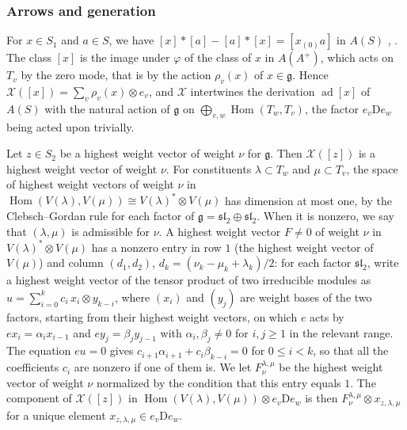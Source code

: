 \documentclass[leqno]{article}
\newcommand{\D}{\mathrm{D}}
\renewcommand{\leq}{\ensuremath{\leqslant}}
\renewcommand{\geq}{\ensuremath{\geqslant}}
\newcommand{\ot}{\otimes}
\numberwithin{equation}{section}
\begin{document}
\subsubsection{Arrows and generation}
\label{zhu:subsec:arrows}

For $x \in S_1$ and $a \in S$, we have $[x] * [a] - [a] * [x] = [x_{(0)} a]$ in $A(S)$ \cite[Lemma 2.1.3 p.~248]{Zhu96}, \cite[(11.1)]{Arh26}. The class $[x]$ is the image under $\varphi$ of the class of $x$ in $A(A^+)$, which acts on $T_v$ by the zero mode, that is by the action $\rho_v(x)$ of $x \in \mathfrak g$. Hence $\mathcal X([x]) = \sum_v \rho_v(x) \ot e_v$, and $\mathcal X$ intertwines the derivation $\operatorname{ad}[x]$ of $A(S)$ with the natural action of $\mathfrak g$ on $\bigoplus_{v,w} \operatorname{Hom}(T_w,T_v)$, the factor $e_v\D e_w$ being acted upon trivially.

Let $z \in S_2$ be a highest weight vector of weight $\nu$ for $\mathfrak g$. Then $\mathcal X([z])$ is a highest weight vector of weight $\nu$. For constituents $\lambda \subset T_w$ and $\mu \subset T_v$, the space of highest weight vectors of weight $\nu$ in $\operatorname{Hom}(V(\lambda),V(\mu)) \cong V(\lambda)^* \ot V(\mu)$ has dimension at most one, by the Clebsch--Gordan rule for each factor of $\mathfrak g = \mathfrak{sl}_2 \oplus \mathfrak{sl}_2$. When it is nonzero, we say that $(\lambda, \mu)$ is admissible for $\nu$. A highest weight vector $F \neq 0$ of weight $\nu$ in $V(\lambda)^* \ot V(\mu)$ has a nonzero entry in row $1$ (the highest weight vector of $V(\mu)$) and column $(d_1,d_2)$, $d_k = (\nu_k - \mu_k + \lambda_k)/2$: for each factor $\mathfrak{sl}_2$, write a highest weight vector of the tensor product of two irreducible modules as $u = \sum_{i=0}^k c_i\, x_i \ot y_{k-i}$, where $(x_i)$ and $(y_j)$ are weight bases of the two factors, starting from their highest weight vectors, on which $e$ acts by $e x_i = \alpha_i x_{i-1}$ and $e y_j = \beta_j y_{j-1}$ with $\alpha_i, \beta_j \neq 0$ for $i, j \geq 1$ in the relevant range. The equation $eu = 0$ gives $c_{i+1}\alpha_{i+1} + c_i \beta_{k-i} = 0$ for $0 \leq i < k$, so that all the coefficients $c_i$ are nonzero if one of them is. We let $F^{\lambda,\mu}_\nu$ be the highest weight vector of weight $\nu$ normalized by the condition that this entry equals $1$. The component of $\mathcal X([z])$ in $\operatorname{Hom}(V(\lambda), V(\mu)) \ot e_v \D e_w$ is then $F^{\lambda,\mu}_\nu \ot x_{z,\lambda,\mu}$ for a unique element $x_{z,\lambda,\mu} \in e_v \D e_w$.
\end{document}
